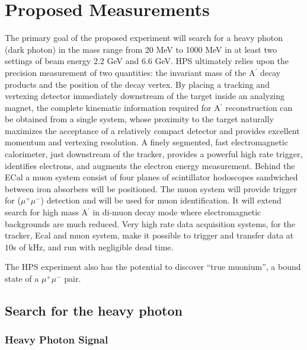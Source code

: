 \section{Proposed Measurements}


The primary goal of the proposed experiment will search for a heavy photon (dark photon) in the mass range from 20 MeV to 1000 MeV in at least two settings of beam energy 2.2 GeV and 6.6 GeV. 
HPS  ultimately relies upon the precision measurement of two quantities: the invariant mass of the A$^\prime$ decay products and the position of the decay vertex. By placing a tracking and vertexing detector immediately downstream of the target inside an analyzing magnet, the complete kinematic information required for A$^\prime$ reconstruction can be obtained from a single system, whose proximity to the target naturally maximizes the acceptance of a relatively compact detector and provides excellent momentum and vertexing resolution. A finely segmented, fast electromagnetic calorimeter, just downstream of the tracker,  provides a powerful high rate trigger, identifies electrons, and augments  the electron energy measurement. Behind the ECal a muon system consist of four planes of scintillator hodoscopes sandwiched between iron absorbers will be positioned. The muon system will provide trigger for ($\mu^+\mu^-$) detection and will be used for muon identification. It will extend search for high mass A$^\prime$ in di-muon decay mode where electromagnetic backgrounds are much reduced. Very high rate data acquisition systems, for the tracker, Ecal and muon system, make it possible to trigger and transfer data at $10$s of kHz, and run with negligible dead time.

The HPS experiment also has the potential to discover ``true muonium'', a bound state of a $\mu^+ \mu^-$ pair. 

\subsection{Search for the heavy photon}
\def \ap {A^\prime}
\def \map {m_{A^\prime}}
\def \thap {\theta_{A^\prime}}
\subsubsection{Heavy Photon Signal}
\label{sec:apsignal}

